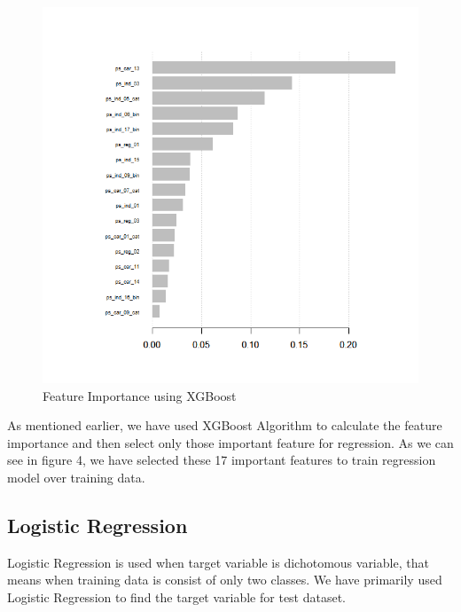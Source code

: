 \documentclass[fleqn,10pt]{SelfArx} %
\begin{document}
    \begin{figure}[h]
	\includegraphics[width=1\columnwidth]{plots/xgboost_feature_importance.png}\centering
	\caption{Feature Importance using XGBoost}
	\end{figure}

As mentioned earlier, we have used XGBoost Algorithm to calculate the feature importance and then select only those important feature for regression. As we can see in figure 4, we have selected these 17 important features to train regression model over training data.\\  

\subsection{Logistic Regression}
Logistic Regression is used when target variable is dichotomous variable, that means when training data is consist of only two classes. We have primarily used Logistic Regression to find the target variable for test dataset.\\
\end{document}
